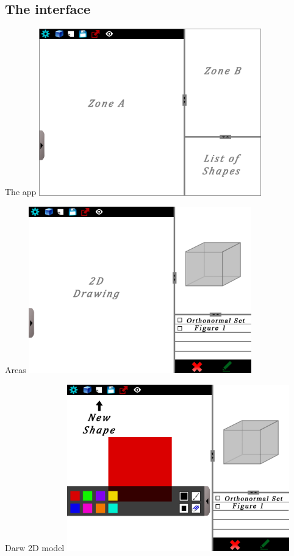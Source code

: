 \documentclass[a4paper,10pt]{beamer}
\begin{document}
		\subsection{The interface}
		
			\begin{frame}{The app}
				\includegraphics[height=205pt]{maquette/maquette_1.png}
			\end{frame}
			
			\begin{frame}{Areas}
				\includegraphics[height=205pt]{maquette/maquette_2.png}
			\end{frame}
			
			\begin{frame}{Darw 2D model}
				\includegraphics[height=205pt]{maquette/maquette_3.png}
			\end{frame}
			
\end{document}
